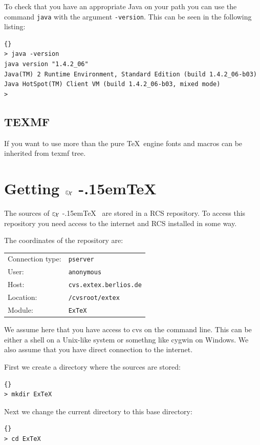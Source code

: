 \documentclass[12pt,div12,a4paper]{scrbook}
\providecommand*{\ExTeX}{\ifx\texorpdfstring\undefined
  \textrm{%
    \ensuremath{\textstyle\varepsilon_{\kern-0.15em\mathcal{X}}}%
    \kern-.15em\TeX}%
  \else\texorpdfstring{%
  \textrm{%
    \ensuremath{\textstyle\varepsilon_{\kern-0.15em\mathcal{X}}}%
    \kern-.15em\TeX
  }}{ExTeX}%
  \fi
}
\begin{document}
To check that you have an appropriate Java on your path you can use
the command \texttt{java} with the argument \texttt{-version}. This
can be seen in the following listing:

{\small
\begin{lstlisting}{}
> java -version
java version "1.4.2_06"
Java(TM) 2 Runtime Environment, Standard Edition (build 1.4.2_06-b03)
Java HotSpot(TM) Client VM (build 1.4.2_06-b03, mixed mode)
>
\end{lstlisting}}


\subsection{TEXMF}

If you want to use more than the pure \TeX\ engine fonts and macros
can be inherited from texmf tree.



\section{Getting \ExTeX}

The sources of \ExTeX\ are stored in a RCS repository. To access this
repository you need access to the internet and RCS installed in some
way.

The coordinates of the repository are:
\medskip

\begin{tabular}{ll}\toprule
  Connection type: & \texttt{pserver}			\\
  User:		   & \texttt{anonymous}			\\
  Host:		   & \texttt{cvs.extex.berlios.de}	\\
  Location:	   & \texttt{/cvsroot/extex}		\\
  Module:	   & \texttt{ExTeX}			\\\bottomrule
\end{tabular}
\bigskip

We assume here that you have access to cvs on the command line. This
can be either a shell on a Unix-like system or somethng like cygwin on
Windows. We also assume that you have direct connection to the internet.

First we create a directory where the sources are stored:
\begin{lstlisting}{}
> mkdir ExTeX
\end{lstlisting}

Next we change the current directory to this base directory:
\begin{lstlisting}{}
> cd ExTeX
\end{lstlisting}
\end{document}
